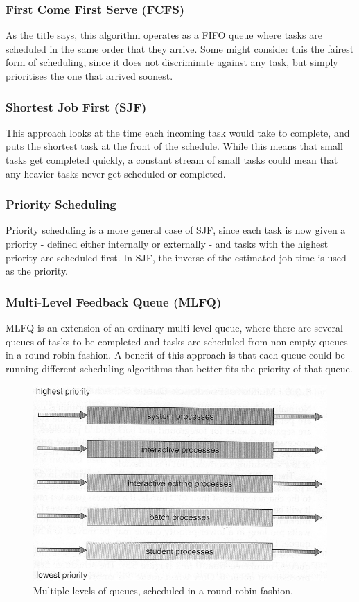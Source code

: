 \documentclass[a4paper,12pt,titlepage]{article}
\begin{document}
\subsubsection{First Come First Serve (FCFS)}
As the title says, this algorithm operates as a FIFO queue where tasks are scheduled in the same order that they arrive. Some might consider this the fairest form of scheduling, since it does not discriminate against any task, but simply prioritises the one that arrived soonest.

\subsubsection{Shortest Job First (SJF)}
This approach looks at the time each incoming task would take to complete, and puts the shortest task at the front of the schedule. While this means that small tasks get completed quickly, a constant stream of small tasks could mean that any heavier tasks never get scheduled or completed.

\subsubsection{Priority Scheduling}
Priority scheduling is a more general case of SJF, since each task is now given a priority - defined either internally or externally - and tasks with the highest priority are scheduled first. In SJF, the inverse of the estimated job time is used as the priority.

\subsubsection{Multi-Level Feedback Queue (MLFQ)}
MLFQ is an extension of an ordinary multi-level queue, where there are several queues of tasks to be completed and tasks are scheduled from non-empty queues in a round-robin fashion. A benefit of this approach is that each queue could be running different scheduling algorithms that better fits the priority of that queue.\\

\begin{figure}[!hbpt]
  \center
  \includegraphics[width=0.6\linewidth]{img/mlqs.jpg}
  \caption{Multiple levels of queues, scheduled in a round-robin fashion. \cite{Bell2018}}
  \label{fig:mlqs}
\end{figure}
\end{document}
